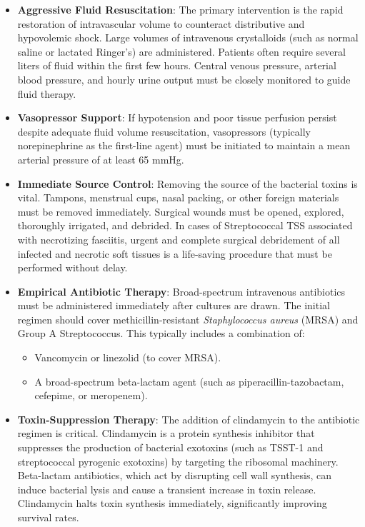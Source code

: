 \begin{itemize}
    \item \textbf{Aggressive Fluid Resuscitation}: The primary intervention is the rapid restoration of intravascular volume to counteract distributive and hypovolemic shock. Large volumes of intravenous crystalloids (such as normal saline or lactated Ringer's) are administered. Patients often require several liters of fluid within the first few hours. Central venous pressure, arterial blood pressure, and hourly urine output must be closely monitored to guide fluid therapy.
    \item \textbf{Vasopressor Support}: If hypotension and poor tissue perfusion persist despite adequate fluid volume resuscitation, vasopressors (typically norepinephrine as the first-line agent) must be initiated to maintain a mean arterial pressure of at least 65 mmHg.
    \item \textbf{Immediate Source Control}: Removing the source of the bacterial toxins is vital. Tampons, menstrual cups, nasal packing, or other foreign materials must be removed immediately. Surgical wounds must be opened, explored, thoroughly irrigated, and debrided. In cases of Streptococcal TSS associated with necrotizing fasciitis, urgent and complete surgical debridement of all infected and necrotic soft tissues is a life-saving procedure that must be performed without delay.
    \item \textbf{Empirical Antibiotic Therapy}: Broad-spectrum intravenous antibiotics must be administered immediately after cultures are drawn. The initial regimen should cover methicillin-resistant \textit{Staphylococcus aureus} (MRSA) and Group A Streptococcus. This typically includes a combination of:
    \begin{itemize}
        \item Vancomycin or linezolid (to cover MRSA).
        \item A broad-spectrum beta-lactam agent (such as piperacillin-tazobactam, cefepime, or meropenem).
    \end{itemize}
    \item \textbf{Toxin-Suppression Therapy}: The addition of clindamycin to the antibiotic regimen is critical. Clindamycin is a protein synthesis inhibitor that suppresses the production of bacterial exotoxins (such as TSST-1 and streptococcal pyrogenic exotoxins) by targeting the ribosomal machinery. Beta-lactam antibiotics, which act by disrupting cell wall synthesis, can induce bacterial lysis and cause a transient increase in toxin release. Clindamycin halts toxin synthesis immediately, significantly improving survival rates.

\end{itemize}
